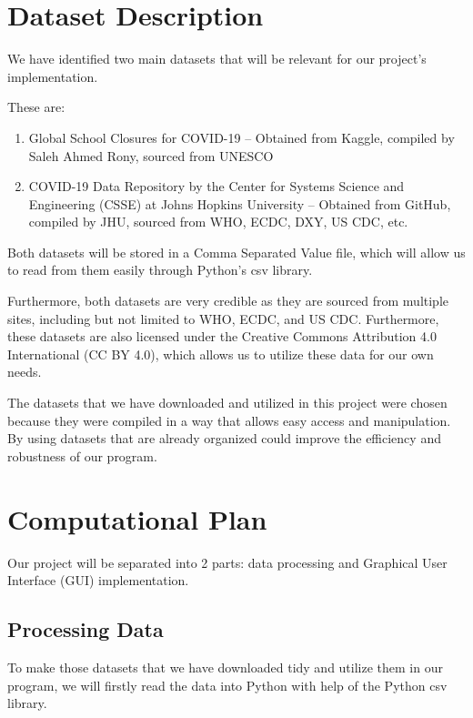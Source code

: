 \documentclass[fontsize=11pt]{article}
\begin{document}
\newpage

\section*{Dataset Description}

We have identified two main datasets that will be relevant for our project’s implementation.

These are:

\begin{enumerate}
    \item
        Global School Closures for COVID-19 – Obtained from Kaggle, compiled by Saleh Ahmed Rony, sourced from UNESCO

    \item
        COVID-19 Data Repository by the Center for Systems Science and Engineering (CSSE) at Johns Hopkins University – Obtained from GitHub, compiled by JHU, sourced from WHO, ECDC, DXY, US CDC, etc.
\end{enumerate}

Both datasets will be stored in a Comma Separated Value file, which will allow us to read from them easily through Python’s csv library.

Furthermore, both datasets are very credible as they are sourced from multiple sites, including but not limited to WHO, ECDC, and US CDC. Furthermore, these datasets are also licensed under the Creative Commons Attribution 4.0 International (CC BY 4.0), which allows us to utilize these data for our own needs.

The datasets that we have downloaded and utilized in this project were chosen because they were compiled in a way that allows easy access and manipulation. By using datasets that are already organized could improve the efficiency and robustness of our program.

\newpage


\section*{Computational Plan}

Our project will be separated into 2 parts: data processing and Graphical User Interface (GUI) implementation.

\subsection*{Processing Data}

To make those datasets that we have downloaded tidy and utilize them in our program, we will firstly read the data into Python with help of the Python csv library.
\end{document}
